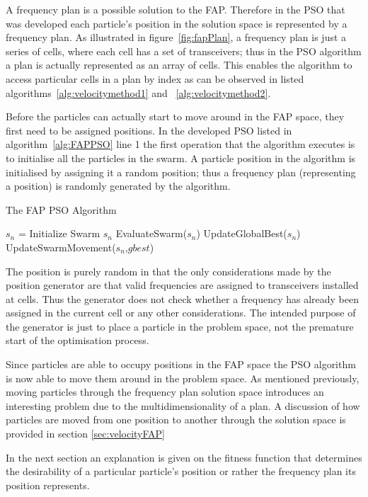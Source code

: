 A frequency plan is a possible solution to the FAP. Therefore in the PSO that was developed each particle's position in the solution space is represented by a frequency plan. As illustrated in figure~\ref{fig:fapPlan}, a frequency plan is just a series of cells, where each cell has a set of transceivers; thus in the PSO algorithm a plan is actually represented as an array of cells. This enables the algorithm to access particular cells in a plan by index as can be observed in listed algorithms~\ref{alg:velocitymethod1} and ~\ref{alg:velocitymethod2}. 

Before the particles can actually start to move around in the FAP space, they first need to be assigned positions. In the developed PSO listed in algorithm~\ref{alg:FAPPSO} line 1 the first operation that the algorithm executes is to initialise all the particles in the swarm. A particle position in the algorithm is initialised by assigning it a random position; thus a frequency plan (representing a position) is randomly generated by the algorithm.
\begin{algorithm}[H]
\label{alg:FAPPSO}
\caption{The FAP PSO Algorithm}
\begin{algorithmic}
\State $s_n$ = Initialize Swarm $s_n$
	\State EvaluateSwarm($s_n$)
	\State UpdateGlobalBest($s_n$)
	\State UpdateSwarmMovement($s_n$,$gbest$)
\EndWhile
\end{algorithmic}
\end{algorithm}


The position is purely random in that the only considerations made by the position generator are that valid frequencies are assigned to transceivers installed at cells. Thus the generator does not check whether a frequency has already been assigned in the current cell or any other considerations. The intended purpose of the generator is just to place a particle in the problem space, not the premature start of the optimisation process.

Since particles are able to occupy positions in the FAP space the PSO algorithm is now able to move them around in the problem space. As mentioned previously, moving particles through the frequency plan solution space introduces an interesting problem due to the multidimensionality of a plan. A discussion of how particles are moved from one position to another through the solution space is provided in section \ref{sec:velocityFAP}

In the next section an explanation is given on the fitness function that determines the desirability of a particular particle's position or rather the frequency plan its position represents.
